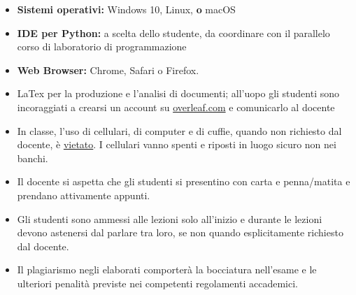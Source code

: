 \documentclass[11pt, a4paper]{article}
\begin{document}
\begin{itemize}[itemsep=2pt,parsep=0pt,topsep=2pt,partopsep=2pt]
	\item[\color{darkblue}\faLaptopCode] \textbf{Sistemi operativi:} \faWindows {} Windows  10,  \faLinux {} Linux, \textcolor{vanierred}{\textbf{o}} \faApple {} macOS 
	\item[\color{darkblue}\faCode] \textbf{IDE per Python:} \faUnity a scelta dello studente, da coordinare con il parallelo corso di laboratorio di programmazione
	\item [{\color{darkblue}\faChrome}] \textbf{Web Browser:} Chrome, Safari o Firefox.   
	\item[{\color{darkblue} \faWpforms}] LaTex per la produzione e l'analisi di documenti; all'uopo gli studenti sono incoraggiati a crearsi un account su \url{overleaf.com} e comunicarlo al docente
\end{itemize}   

\begin{itemize}[itemsep=2.5pt,parsep=0pt,topsep=8pt,partopsep=4pt]
	\item[{ \color{darkblue} \faLaptop \faMobile \faHeadphones}] In classe, l'uso di cellulari, di computer e di cuffie, quando non richiesto dal docente, \`{e}  \underline{vietato}. I cellulari vanno spenti e riposti in luogo sicuro non nei banchi.
	
	\item[{\color{darkblue} \faEdit}] Il docente si aspetta che gli studenti si presentino con carta e penna/matita e prendano attivamente appunti.
	\item[{\color{darkblue} \faWechat}] Gli studenti sono ammessi alle lezioni solo all'inizio e durante le lezioni devono astenersi dal parlare tra loro, se non quando esplicitamente richiesto dal docente.
	
	\item[{\color{darkred} \faThumbsDown}] Il plagiarismo negli elaborati comporter\`{a} la bocciatura nell'esame e le ulteriori penalit\`{a} previste nei competenti regolamenti accademici.
\end{itemize}


\setcounter{lezione}{0}
\addtocounter{lezione}{1}
\end{document}
